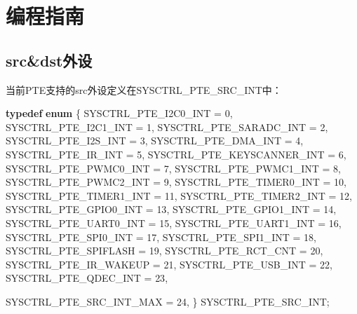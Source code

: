 \documentclass[
  12pt,
]{book}
\newenvironment{Shaded}{\begin{snugshade}}{\end{snugshade}}
\newcommand{\DecValTok}[1]{\textcolor[rgb]{0.00,0.00,0.81}{#1}}
\newcommand{\KeywordTok}[1]{\textcolor[rgb]{0.13,0.29,0.53}{\textbf{#1}}}
\newcommand{\NormalTok}[1]{#1}
\begin{document}
\hypertarget{ux7f16ux7a0bux6307ux5357-4}{%
\section{编程指南}\label{ux7f16ux7a0bux6307ux5357-4}}

\hypertarget{srcdstux5916ux8bbe}{%
\subsection{src\&dst外设}\label{srcdstux5916ux8bbe}}

当前PTE支持的src外设定义在SYSCTRL\_PTE\_SRC\_INT中：

\begin{Shaded}
\begin{Highlighting}[]
\KeywordTok{typedef} \KeywordTok{enum}
\NormalTok{\{}
\NormalTok{    SYSCTRL_PTE_I2C0_INT       = }\DecValTok{0}\NormalTok{,}
\NormalTok{    SYSCTRL_PTE_I2C1_INT       = }\DecValTok{1}\NormalTok{,}
\NormalTok{    SYSCTRL_PTE_SARADC_INT     = }\DecValTok{2}\NormalTok{,}
\NormalTok{    SYSCTRL_PTE_I2S_INT        = }\DecValTok{3}\NormalTok{,}
\NormalTok{    SYSCTRL_PTE_DMA_INT        = }\DecValTok{4}\NormalTok{,}
\NormalTok{    SYSCTRL_PTE_IR_INT         = }\DecValTok{5}\NormalTok{,}
\NormalTok{    SYSCTRL_PTE_KEYSCANNER_INT = }\DecValTok{6}\NormalTok{,}
\NormalTok{    SYSCTRL_PTE_PWMC0_INT      = }\DecValTok{7}\NormalTok{,}
\NormalTok{    SYSCTRL_PTE_PWMC1_INT      = }\DecValTok{8}\NormalTok{,}
\NormalTok{    SYSCTRL_PTE_PWMC2_INT      = }\DecValTok{9}\NormalTok{,}
\NormalTok{    SYSCTRL_PTE_TIMER0_INT     = }\DecValTok{10}\NormalTok{,}
\NormalTok{    SYSCTRL_PTE_TIMER1_INT     = }\DecValTok{11}\NormalTok{,}
\NormalTok{    SYSCTRL_PTE_TIMER2_INT     = }\DecValTok{12}\NormalTok{,}
\NormalTok{    SYSCTRL_PTE_GPIO0_INT      = }\DecValTok{13}\NormalTok{,}
\NormalTok{    SYSCTRL_PTE_GPIO1_INT      = }\DecValTok{14}\NormalTok{,}
\NormalTok{    SYSCTRL_PTE_UART0_INT      = }\DecValTok{15}\NormalTok{,}
\NormalTok{    SYSCTRL_PTE_UART1_INT      = }\DecValTok{16}\NormalTok{,}
\NormalTok{    SYSCTRL_PTE_SPI0_INT       = }\DecValTok{17}\NormalTok{,}
\NormalTok{    SYSCTRL_PTE_SPI1_INT       = }\DecValTok{18}\NormalTok{,}
\NormalTok{    SYSCTRL_PTE_SPIFLASH       = }\DecValTok{19}\NormalTok{,}
\NormalTok{    SYSCTRL_PTE_RCT_CNT        = }\DecValTok{20}\NormalTok{,}
\NormalTok{    SYSCTRL_PTE_IR_WAKEUP      = }\DecValTok{21}\NormalTok{,}
\NormalTok{    SYSCTRL_PTE_USB_INT        = }\DecValTok{22}\NormalTok{,}
\NormalTok{    SYSCTRL_PTE_QDEC_INT       = }\DecValTok{23}\NormalTok{,}

\NormalTok{    SYSCTRL_PTE_SRC_INT_MAX    = }\DecValTok{24}\NormalTok{,}
\NormalTok{\} SYSCTRL_PTE_SRC_INT;}
\end{Highlighting}
\end{Shaded}
\end{document}
